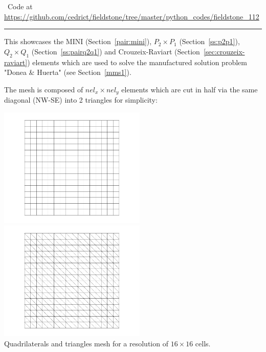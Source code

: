 

\begin{center}
\inpython~Code at \url{https://github.com/cedrict/fieldstone/tree/master/python_codes/fieldstone_112}
\end{center}

\par\noindent\rule{\textwidth}{0.4pt}



This \stone showcases the MINI (Section~\ref{pair:mini}), 
$P_2\times P_1$ (Section~\ref{ss:p2p1}), $Q_2\times Q_1$ (Section~\ref{ss:pairq2q1}) 
and Crouzeix-Raviart  (Section~\ref{sec:crouzeix-raviart})
elements which are used to solve the manufactured solution problem "Donea \& Huerta" (see Section~\ref{mms1}).

The mesh is composed of $nel_x \times nel_y$ elements which are cut in half via the same diagonal (NW-SE) into 2 triangles
for simplicity: 

\begin{center}
\includegraphics[width=7cm]{python_codes/fieldstone_112/results/grid_quads}
\includegraphics[width=7cm]{python_codes/fieldstone_112/results/grid_triangles}\\
{\captionfont Quadrilaterals and triangles mesh for a resolution of $16\times 16$ cells.} 
\end{center}

